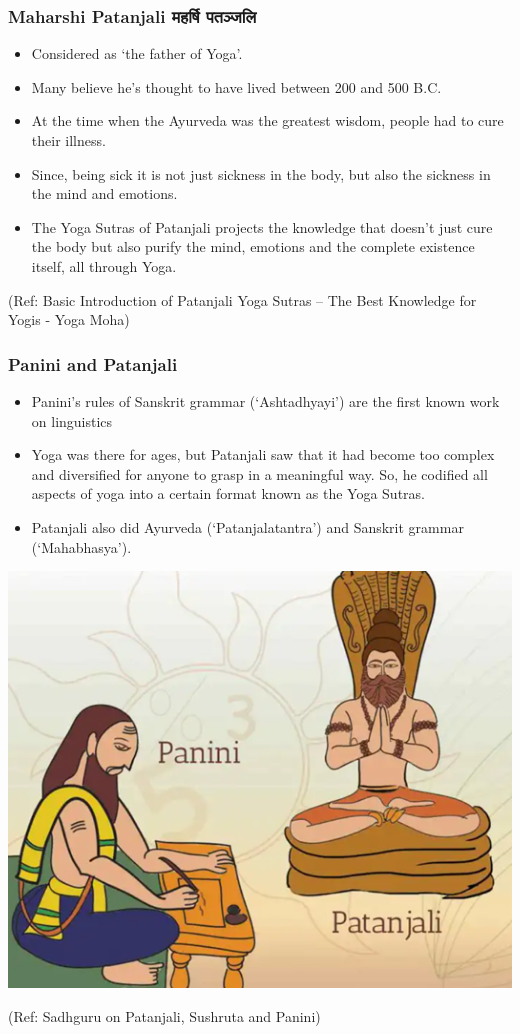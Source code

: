 \begin{frame}[fragile]\frametitle{Maharshi Patanjali महर्षि पतञ्जलि}

	\begin{itemize}
	\item Considered as `the father of Yoga'.
\item Many believe he’s thought to have lived between 200 and 500 B.C. 
\item At the time when the Ayurveda was the greatest wisdom, people had to cure their illness.	
\item Since, being sick it is not just sickness in the body, but also the sickness in the mind and emotions. 
\item The Yoga Sutras of Patanjali projects the knowledge that doesn’t just cure the body but also purify the mind, emotions and the complete existence itself, all through Yoga.
	\end{itemize}

\tiny{(Ref: Basic Introduction of Patanjali Yoga Sutras – The Best Knowledge for Yogis - Yoga Moha)}

\end{frame}

\begin{frame}[fragile]\frametitle{Panini and Patanjali}

	\begin{itemize}
	\item Panini's rules of Sanskrit grammar (`Ashtadhyayi') are the first known work on linguistics
	\item Yoga was there for ages, but Patanjali saw that it had become too complex and diversified for anyone to grasp in a meaningful way. So, he codified all aspects of yoga into a certain format known as the Yoga Sutras. 
	\item Patanjali also did Ayurveda (`Patanjalatantra') and Sanskrit grammar (`Mahabhasya').
	\end{itemize}

\begin{center}
\includegraphics[width=0.3\linewidth,keepaspectratio]{images/patanjalipanini}
\end{center}


\tiny{(Ref: Sadhguru on Patanjali, Sushruta and Panini)}

\end{frame}



